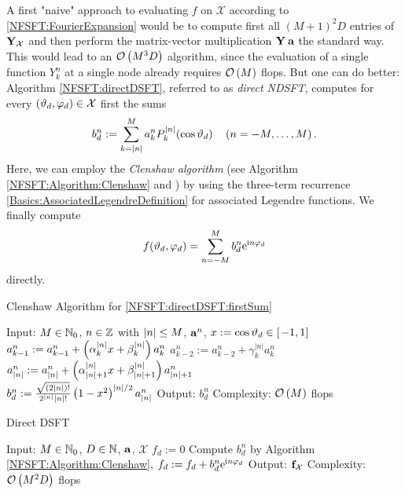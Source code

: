 A first "naive" approach to evaluating $f$ on $\mathcal{X}$ according to \eqref{NFSFT:FourierExpansion} would be to compute first all $(M+1)^2D$
entries of $\mathbf{Y}_{\mathcal{X}}$ and then perform the matrix-vector multiplication $\mathbf{Y} \: \mathbf{a}$ the standard way. This would lead to an $\mathcal{O}\left(M^3D\right)$ algorithm, since the evaluation of a single function 
$Y_{k}^n$ at a single node already requires $\mathcal{O}\left(M\right)$ flops.
But one can do better: Algorithm \ref{NFSFT:directDSFT}, referred 
to as \emph{direct NDSFT}, computes 
for every $\left(\vartheta_{d},\varphi_{d}\right) \in \mathcal{X}$ first the sums 
\begin{equation}
  \label{NFSFT:directDSFT:firstSum}
  b^{n}_{d} := \sum_{k=\left\vert n\right\vert}^M a_{k}^n P_{k}^{\left\vert n\right\vert}{\hspace{-0.4ex}}\left(\cos\vartheta_{d}\right) \quad \left(n=-M,\ldots,M\right). 
\end{equation}
Here, we can employ the \emph{Clenshaw algorithm} (see Algorithm \ref{NFSFT:Algorithm:Clenshaw} and \cite{prtevefl}) 
by using the three-term recurrence \eqref{Basics:AssociatedLegendreDefinition}
for associated Legendre functions. We finally compute
\begin{equation}
  \label{NFSFT:directNDSFT:secondSum}
  f{\hspace{-0.4ex}}\left(\vartheta_{d},\varphi_{d}\right) = \sum_{n=-M}^M b^{n}_d \mbox{\rm{e}}^{\mbox{\scriptsize\rm{i}} n \varphi_{d}}
\end{equation}
directly.
\begin{algorithm}[htb]
  \caption{Clenshaw Algorithm for \eqref{NFSFT:directDSFT:firstSum}}
  \label{NFSFT:Algorithm:Clenshaw}    
  \begin{algorithmic}
    \STATE  Input: $M \in \mathbb{N}_{0}$, $n \in \mathbb{Z}$ with $\left\vert n\right\vert \le M$, $\mathbf{a}^n$, $x := \cos\vartheta_{d} \in \left[\left.-1,1\right]\right.$
    \STATE
      \STATE $a_{k-1}^n := a_{k-1}^n + \left(\alpha_{k}^{|n|} x + \beta_{k}^{|n|}\right) a_{k}^n$
      \STATE $a_{k-2}^n := a_{k-2}^n + \gamma_{k}^{|n|} a_{k}^n$
    \ENDFOR
    \STATE $a_{\left\vert n\right\vert}^n := a_{\left\vert n\right\vert}^n + \left(\alpha_{\left\vert n\right\vert+1}^{|n|} x + \beta_{\left\vert n\right\vert+1}^{|n|}\right) a_{\left\vert n\right\vert+1}^n$\\[0.5ex]
    \STATE $b_{d}^n := \frac{\sqrt{(2|n|)!}}{2^{|n|} |n|!} \left(1-x^2\right)^{|n|/2} a_{\left\vert n\right\vert}^n$
    \STATE
    \STATE Output: $b_{d}^n$
    \STATE Complexity: $\mathcal{O}\left(M\right)$ flops
\end{algorithmic}
\end{algorithm}
\begin{algorithm}[htb]
  \caption{Direct DSFT}
  \label{NFSFT:directDSFT}    
  \begin{algorithmic}
    \STATE  Input: $M \in \mathbb{N}_{0}$, $D \in \mathbb{N}$, $\mathbf{a}$, $\mathcal{X}$
    \STATE
      \STATE $f_{d} := 0$
        \STATE Compute $b^{n}_d$ by Algorithm \ref{NFSFT:Algorithm:Clenshaw},
        \STATE $f_{d} := f_{d} + b^n_d \mbox{\rm{e}}^{\mbox{\scriptsize\rm{i}} n \varphi_{d}}$
      \ENDFOR
    \ENDFOR
    \STATE
    \STATE Output: $\mathbf{f}_{\mathcal{X}}$
    \STATE Complexity: $\mathcal{O}\left(M^2 D\right)$ flops
\end{algorithmic}
\end{algorithm}
